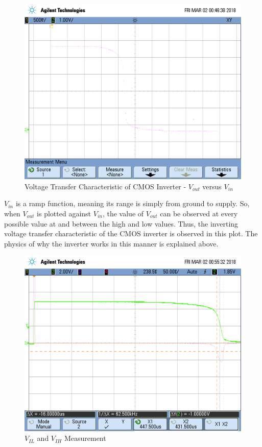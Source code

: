 \begin{figure}[h!]
	\centering
	\includegraphics[scale=0.50]{../images/vtc.png}
	\caption{Voltage Transfer Characteristic of CMOS Inverter - $V_{out}$ versus $V_{in}$}
	\label{fig:vtc.png}
\end{figure}

\FloatBarrier

$V_{in}$ is a ramp function, meaning its range is simply from ground to supply.
So, when $V_{out}$ is plotted against $V_{in}$, the value of $V_{out}$ can be observed at every possible value at and between the high and low values.
Thus, the inverting voltage transfer characteristic of the CMOS inverter is observed in this plot.
The physics of why the inverter works in this manner is explained above.

\FloatBarrier

\begin{figure}[h!]
	\centering
	\includegraphics[scale=0.50]{../images/vil_vih_measure.png}
	\caption{$V_{IL}$ and $V_{IH}$ Measurement}
	\label{fig:vil_vih_measure}
\end{figure}

